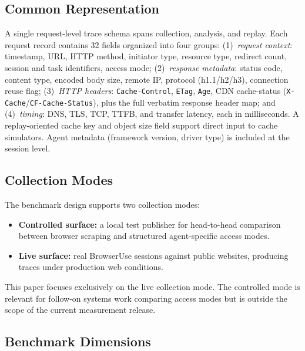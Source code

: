 \documentclass[10pt,sigconf,letterpaper,anonymous,nonacm]{acmart}
\begin{document}
\subsection{Common Representation}

A single request-level trace schema spans collection, analysis, and
replay.  Each request record contains 32 fields organized into four
groups: (1)~\emph{request context}: timestamp, URL, HTTP method,
initiator type, resource type, redirect count, session and task
identifiers, access mode; (2)~\emph{response metadata}: status code,
content type, encoded body size, remote IP, protocol (h1.1/h2/h3),
connection reuse flag; (3)~\emph{HTTP headers}: \texttt{Cache-Control},
\texttt{ETag}, \texttt{Age}, CDN cache-status
(\texttt{X-Cache}/\texttt{CF-Cache-Status}), plus the full verbatim
response header map; and (4)~\emph{timing}: DNS, TLS, TCP, TTFB, and
transfer latency, each in milliseconds.  A replay-oriented cache key
and object size field support direct input to cache simulators.  Agent
metadata (framework version, driver type) is included at the session
level.

\subsection{Collection Modes}

The benchmark design supports two collection modes:
\begin{itemize}
\item \textbf{Controlled surface:} a local test publisher for
  head-to-head comparison between browser scraping and structured
  agent-specific access modes.
\item \textbf{Live surface:} real BrowserUse sessions against public
  websites, producing traces under production web conditions.
\end{itemize}
This paper focuses exclusively on the live collection mode.  The controlled
mode is relevant for follow-on systems work comparing access modes
but is outside the scope of the current measurement release.

\subsection{Benchmark Dimensions}
\end{document}
